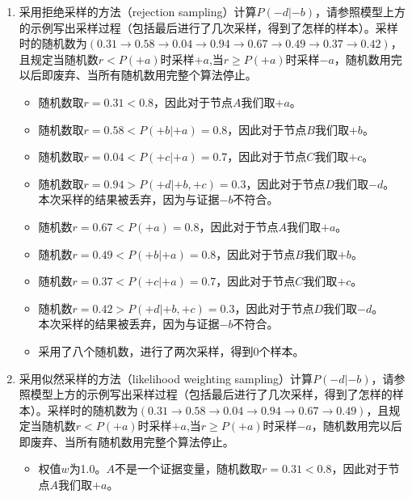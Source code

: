 \begin{enumerate}
    \item 采用拒绝采样的方法（rejection sampling）计算$P(-d|-b)$，请参照模型上方的示例写出采样过程（包括最后进行了几次采样，得到了怎样的样本）。采样时的随机数为$(0.31\rightarrow 0.58\rightarrow 0.04 \rightarrow 0.94 \rightarrow 0.67 \rightarrow 0.49\rightarrow 0.37 \rightarrow 0.42)$，且规定当随机数$r<P(+a)$时采样$+a$,当$r\geq P(+a)$时采样$-a$，随机数用完以后即废弃、当所有随机数用完整个算法停止。
    \begin{solution}
        \begin{itemize}
            \item 随机数取$r=0.31<0.8$，因此对于节点$A$我们取$+a$。
            \item 随机数取$r=0.58<P(+b|+a)=0.8$，因此对于节点$B$我们取$+b$。
            \item 随机数取$r=0.04<P(+c|+a)=0.7$，因此对于节点$C$我们取$+c$。
            \item 随机数取$r=0.94>P(+d|+b,+c)=0.3$，因此对于节点$D$我们取$-d$。\\
            本次采样的结果被丢弃，因为与证据$-b$不符合。
            \item 随机数$r=0.67<P(+a)=0.8$，因此对于节点$A$我们取$+a$。
            \item 随机数$r=0.49<P(+b|+a)=0.8$，因此对于节点$B$我们取$+b$。
            \item 随机数$r=0.37<P(+c|+a)=0.7$，因此对于节点$C$我们取$+c$。
            \item 随机数$r=0.42>P(+d|+b, +c)=0.3$，因此对于节点$D$我们取$-d$。\\
            本次采样的结果被丢弃，因为与证据$-b$不符合。
            \item 采用了八个随机数，进行了两次采样，得到0个样本。
        \end{itemize}
    \end{solution}
    \item 采用似然采样的方法（likelihood weighting sampling）计算$P(-d|-b)$，请参照模型上方的示例写出采样过程（包括最后进行了几次采样，得到了怎样的样本）。采样时的随机数为$(0.31\rightarrow 0.58\rightarrow 0.04 \rightarrow 0.94 \rightarrow 0.67 \rightarrow 0.49)$，且规定当随机数$r<P(+a)$时采样$+a$,当$r\geq P(+a)$时采样$-a$，随机数用完以后即废弃、当所有随机数用完整个算法停止。
    \begin{solution}
        \begin{itemize}
            \item 权值$w$为1.0。$A$不是一个证据变量，随机数取$r=0.31<0.8$，因此对于节点$A$我们取$+a$。

\end{itemize}
\end{solution}
\end{enumerate}
